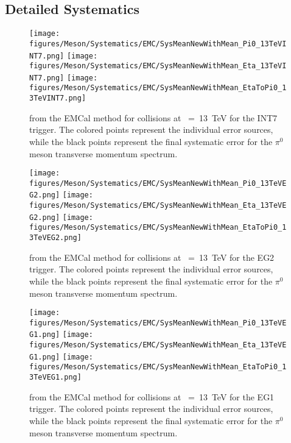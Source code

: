 		\subsection{Detailed Systematics}
		\label{sec:SysDetailed}

			\begin{figure}[t]
				\centering
				\texttt{[image: figures/Meson/Systematics/EMC/SysMeanNewWithMean\_Pi0\_13TeVINT7.png]}
				\texttt{[image: figures/Meson/Systematics/EMC/SysMeanNewWithMean\_Eta\_13TeVINT7.png]}
				\texttt{[image: figures/Meson/Systematics/EMC/SysMeanNewWithMean\_EtaToPi0\_13TeVINT7.png]}
				\caption{from the \ac{EMCal} method for \pp collisions at \s~=~13~TeV for the INT7 trigger. The colored points represent the individual error sources, while the black points represent the final systematic error for the $\pi^0$ meson transverse momentum spectrum.}
				\label{fig:SysErrEMCDetailed_INT7}
			\end{figure}
			\begin{figure}[t]
				\centering
			  	\texttt{[image: figures/Meson/Systematics/EMC/SysMeanNewWithMean\_Pi0\_13TeVEG2.png]}
			  	\texttt{[image: figures/Meson/Systematics/EMC/SysMeanNewWithMean\_Eta\_13TeVEG2.png]}
			  	\texttt{[image: figures/Meson/Systematics/EMC/SysMeanNewWithMean\_EtaToPi0\_13TeVEG2.png]}
			  	\caption{from the \ac{EMCal} method for \pp collisions at \s~=~13~TeV for the EG2 trigger. The colored points represent the individual error sources, while the black points represent the final systematic error for the $\pi^0$ meson transverse momentum spectrum.}
			  	\label{fig:SysErrEMCDetailed_EG2}
			 \end{figure}

			 \begin{figure}[t]
			  	\centering
			  	\texttt{[image: figures/Meson/Systematics/EMC/SysMeanNewWithMean\_Pi0\_13TeVEG1.png]}
			  	\texttt{[image: figures/Meson/Systematics/EMC/SysMeanNewWithMean\_Eta\_13TeVEG1.png]}
			  	\texttt{[image: figures/Meson/Systematics/EMC/SysMeanNewWithMean\_EtaToPi0\_13TeVEG1.png]}
			  	\caption{from the \ac{EMCal} method for \pp collisions at \s~=~13~TeV for the EG1 trigger. The colored points represent the individual error sources, while the black points represent the final systematic error for the $\pi^0$ meson transverse momentum spectrum.}
			  	\label{fig:SysErrEMCDetailed_EG1}
			  \end{figure}


